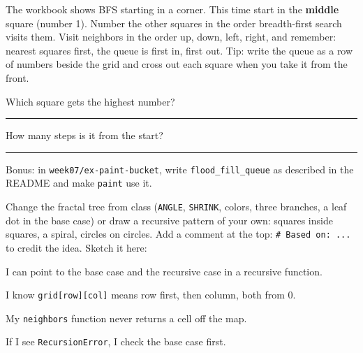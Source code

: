 \begin{challenge}
The workbook shows BFS starting in a corner. This time start in the \textbf{middle} square (number 1). Number the other squares in the order breadth-first search visits them. Visit neighbors in the order up, down, left, right, and remember: nearest squares first, the queue is first in, first out. Tip: write the queue as a row of numbers beside the grid and cross out each square when you take it from the front.

\begin{center}
\end{center}

Which square gets the highest number? \rule{2.5cm}{0.4pt} How many steps is it from the start? \rule{1cm}{0.4pt}

Bonus: in \texttt{week07/ex-paint-bucket}, write \texttt{flood\_fill\_queue} as described in the README and make \texttt{paint} use it.
\end{challenge}

\begin{creative}
Change the fractal tree from class (\texttt{ANGLE}, \texttt{SHRINK}, colors, three branches, a leaf dot in the base case) or draw a recursive pattern of your own: squares inside squares, a spiral, circles on circles. Add a comment at the top: \texttt{\# Based on: ...} to credit the idea. Sketch it here:
\answerspace{3.5cm}
\end{creative}

\begin{selfcheck}
  \item I can point to the base case and the recursive case in a recursive function.
  \item I know \texttt{grid[row][col]} means row first, then column, both from 0.
  \item My \texttt{neighbors} function never returns a cell off the map.
  \item If I see \texttt{RecursionError}, I check the base case first.
\end{selfcheck}
